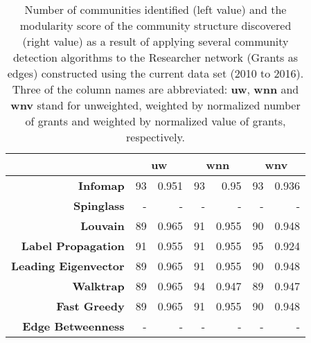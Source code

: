 \begin{table}[!htbp]
\centering
\caption[Number of communities and modularity score of community structure identified within the Researcher network (Grants as edges) constructed using the current data set (2010 to 2016)]{Number of communities identified (left value) and the modularity score of the community structure discovered (right value) as a result of applying several community detection algorithms to the Researcher network (Grants as edges) constructed using the current data set (2010 to 2016). Three of the column names are abbreviated: \textbf{uw}, \textbf{wnn} and \textbf{wnv} stand for unweighted, weighted by normalized number of grants and weighted by normalized value of grants, respectively.}
\label{table:researcher_b_current_modularity_appendix}
\begin{tabular}{r|rr|rr|rr}
\textbf{} & \multicolumn{2}{c|}{\textbf{uw}} & \multicolumn{2}{c|}{\textbf{wnn}} & \multicolumn{2}{c}{\textbf{wnv}}\\
\hline
\textbf{Infomap} & {93} & {0.951} & {93} & {0.95} & {93} & {0.936}\\
\textbf{Spinglass} & {-} & {-} & {-} & {-} & {-} & {-}\\
\textbf{Louvain} & {89} & {0.965} & {91} & {0.955} & {90} & {0.948}\\
\textbf{Label Propagation} & {91} & {0.955} & {91} & {0.955} & {95} & {0.924}\\
\textbf{Leading Eigenvector} & {89} & {0.965} & {91} & {0.955} & {90} & {0.948}\\
\textbf{Walktrap} & {89} & {0.965} & {94} & {0.947} & {89} & {0.947}\\
\textbf{Fast Greedy} & {89} & {0.965} & {91} & {0.955} & {90} & {0.948}\\
\textbf{Edge Betweenness} & {-} & {-} & {-} & {-} & {-} & {-}\\
\end{tabular}
\end{table}

